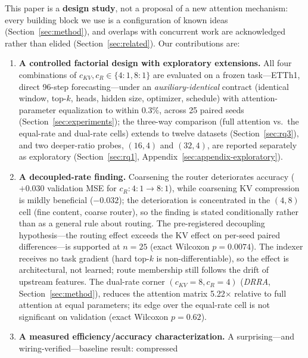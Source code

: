 This paper is a \textbf{design study}, not a proposal of a new attention
mechanism: every building block we use is a configuration of known ideas
(Section~\ref{sec:method}), and overlaps with concurrent work
\citep{yuan2025nsa,deepseekv4_2026} are acknowledged rather than elided
(Section~\ref{sec:related}). Our contributions are:
\begin{enumerate}
  \item[(a)] \textbf{A controlled factorial design with exploratory extensions.} All four
        combinations of $c_{KV}, c_R \in \{4{:}1, 8{:}1\}$ are evaluated on a
        frozen task---ETTh1, direct 96-step forecasting---under an
        \emph{auxiliary-identical} contract (identical window, top-$k$, heads,
        hidden size, optimizer, schedule) with attention-parameter
        equalization to within $0.3\%$, across 25 paired seeds
        (Section~\ref{sec:experiments}); the three-way comparison (full
        attention vs.\ the equal-rate and dual-rate cells) extends to twelve
        datasets (Section~\ref{sec:rq3}), and two deeper-ratio probes, $(16,4)$ and
        $(32,4)$, are reported separately as exploratory (Section~\ref{sec:rq1},
        Appendix~\ref{sec:appendix-exploratory}).
  \item[(b)] \textbf{A decoupled-rate finding.} Coarsening the
        router deteriorates accuracy ($+0.030$ validation MSE for
        $c_R{:}4{:}1 \to 8{:}1$), while coarsening KV compression is
        mildly beneficial ($-0.032$); the deterioration is concentrated in the
        $(4,8)$ cell (fine content, coarse router), so the finding is stated
        conditionally rather than as a general rule about routing.
        The pre-registered decoupling
        hypothesis---the routing effect exceeds the KV effect on per-seed
        paired differences---is supported at $n{=}25$ (exact Wilcoxon
        $p = 0.0074$). The indexer receives no task gradient (hard top-$k$ is
        non-differentiable), so the effect is architectural, not learned; route
        membership still follows the drift of upstream features. The dual-rate corner
        $(c_{KV}{=}8, c_R{=}4)$ (\emph{DRRA},
        Section~\ref{sec:method}), reduces the attention matrix 5.22$\times$
        relative to full attention
        at equal parameters; its edge over the equal-rate cell is
        not significant on validation (exact Wilcoxon $p = 0.62$).
  \item[(c)] \textbf{A measured efficiency/accuracy characterization.} A
        surprising---and wiring-verified---baseline result: compressed

\end{enumerate}
